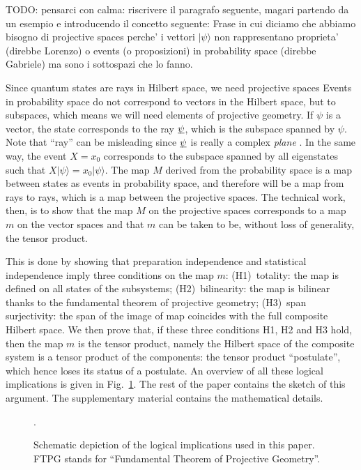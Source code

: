 \documentclass[aps,prl,amsmath,amssymb,twocolumn]{revtex4}
\theoremstyle{plain}
\theoremstyle{definition}
\theoremstyle{remark}
\newcommand{\pj}[1] {\underbar{$#1$}}
\def\>{\rangle}
\begin{document}
	
	TODO: pensarci con calma: riscrivere il paragrafo seguente, magari partendo da un esempio e introducendo il concetto seguente:
	Frase in cui diciamo che abbiamo bisogno di projective spaces perche' i vettori $|\psi\>$ non rappresentano proprieta' (direbbe Lorenzo) o events (o proposizioni) in probability space (direbbe Gabriele) ma sono i sottospazi che lo fanno.
	
	
	Since quantum states are rays in Hilbert space, we need projective spaces
	Events in probability space do not correspond to vectors in the Hilbert space, but to subspaces, which means we will need elements of projective geometry. If $\psi$ is a vector, the state corresponds to the ray $\pj{\psi}$, which is the subspace spanned by $\psi$. Note that ``ray'' can be misleading since $\pj{\psi}$ is really a complex { \em plane }. In the same way, the event $X = x_0$ corresponds to the subspace spanned by all eigenstates such that $X | \psi \> = x_0 |\psi\>$. The map $M$ derived from the probability space is a map between states as events in probability space, and therefore will be a map from rays to rays, which is a map between the projective spaces. The technical work, then, is to show that the map $M$ on the projective spaces corresponds to a map $m$ on the vector spaces and that $m$ can be taken to be, without loss of generality, the tensor product.
	
	This is done by showing that preparation independence and
	statistical independence imply three conditions on the map $m$:
	(H1)~totality: the map is defined on all states of the subsystems;
	(H2)~bilinearity: the map is bilinear thanks to the fundamental
	theorem of projective geometry; (H3)~span surjectivity: the span of
	the image of map coincides with the full composite Hilbert space.  We
	then prove that, if these three conditions H1, H2 and H3 hold, then
	the map $m$ is the tensor product, namely the Hilbert space of the
	composite system is a tensor product of the components: the tensor
	product ``postulate'', which hence loses its status of a postulate. An
	overview of all these logical implications is given in
	Fig.~\ref{f:fig}. The rest of the paper contains the sketch of this
	argument. The supplementary material contains the mathematical details.
	
	\begin{figure}[ht]
		.\hsize\leavevmode{}
		\caption{Schematic depiction of the logical implications used
			in this paper. FTPG stands for ``Fundamental Theorem of Projective Geometry''.  \label{f:fig}}\end{figure}
	
\end{document}
